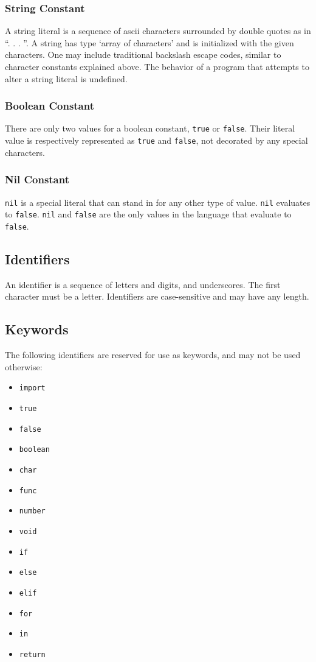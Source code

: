\subsubsection{String Constant}
A string literal is a sequence of ascii characters surrounded by double quotes as in ``. . . ''. A string has type `array of characters' and is initialized with the given characters. One may include traditional backslash escape codes, similar to character constants explained above. The behavior of a program that attempts to alter a string literal is undefined.
\subsubsection{Boolean Constant}
There are only two values for a boolean constant, \verb!true! or \verb!false!. Their literal value is respectively represented as \verb!true! and \verb!false!, not decorated by any special characters.
\subsubsection{Nil Constant}
\verb!nil! is a special literal that can stand in for any other type of value. \verb!nil! evaluates to \verb!false!. \verb!nil! and \verb!false! are the only values in the language that evaluate to \verb!false!.
\subsection{Identifiers}
An identifier is a sequence of letters and digits, and underscores. The first character must be a letter. Identifiers are case-sensitive and may have any length.
\subsection{Keywords}
The following identifiers are reserved for use as keywords, and may not be used otherwise:
\begin{itemize}
\item
\verb!import!
\item
\verb!true!
\item
\verb!false!
\item
\verb!boolean!
\item
\verb!char!
\item
\verb!func!
\item
\verb!number!
\item
\verb!void!
\item
\verb!if!
\item
\verb!else!
\item
\verb!elif!
\item
\verb!for!
\item
\verb!in!
\item
\verb!return!
\end{itemize}

